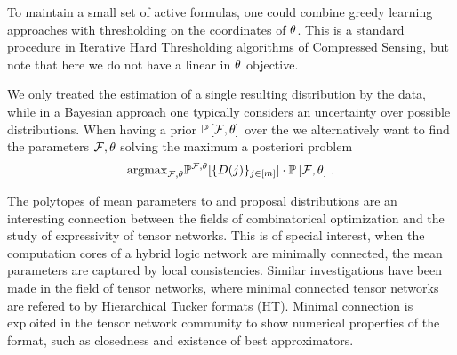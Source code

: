 \begin{remark}
    To maintain a small set of active formulas, one could combine greedy learning approaches with thresholding on the coordinates of $\theta$.
    This is a standard procedure in Iterative Hard Thresholding algorithms of Compressed Sensing, but note that here we do not have a linear in $\theta$ objective.
\end{remark}










\begin{remark}
    We only treated the estimation of a single resulting distribution by the data, while in a Bayesian approach one typically considers an uncertainty over possible distributions.
    When having a prior $\mathbb{P}\left[\mathcal{F},\theta\right]$ over the \MarkovLogicNetworks{} we alternatively want to find the parameters $\mathcal{F},\theta$ solving the maximum a posteriori problem
    \begin{align}
        \mathrm{argmax}_{\mathcal{F},\theta} \mathbb{P}^{\mathcal{F},\theta}[\{D(j)\}_{j\in[m]}]\cdot \mathbb{P}\left[\mathcal{F},\theta\right]\, .
    \end{align}
\end{remark}

The polytopes of mean parameters to \HybridLogicNetworks{} and proposal distributions are an interesting connection between the fields of combinatorical optimization and the study of expressivity of tensor networks.
This is of special interest, when the computation cores of a hybrid logic network are minimally connected, the mean parameters are captured by local consistencies.
Similar investigations have been made in the field of tensor networks, where minimal connected tensor networks are refered to by Hierarchical Tucker formats (HT).
Minimal connection is exploited in the tensor network community to show numerical properties of the format, such as closedness and existence of best approximators.














